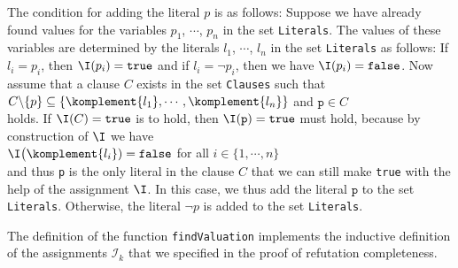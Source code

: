 \begin{enumerate}
      The condition for adding the literal $p$ is as follows:
      Suppose we have already found values for the variables
      $p_1$, $\cdots$, $p_n$ in the set \texttt{Literals}.
      The values of these variables are determined by the literals $l_1$, $\cdots$, $l_n$ in the set \texttt{Literals}
      as follows: If $l_i = p_i$, then $\I(p_i) = \texttt{true}$
      and if $l_i = \neg p_i$, then we have $\I(p_i) = \texttt{false}$.
      Now assume that a clause $C$ exists in the set \texttt{Clauses} such that
      \\[0.2cm]
      \hspace*{1.3cm}
      $C \backslash \{p\} \subseteq \{ \komplement{l_1}, \cdots, \komplement{l_n} \}$ \quad and \quad $\texttt{p} \in C$
      \\[0.2cm]
      holds. If $\I(C) = \texttt{true}$ is to hold, then $\I(\texttt{p}) = \texttt{true}$ must hold, because
      by construction of $\I$ we have
      \\[0.2cm]
      \hspace*{1.3cm}
      $\I\bigl(\komplement{l_i}) = \texttt{false}$ \quad for all $i \in \{1,\cdots,n\}$
      \\[0.2cm]
      and thus \texttt{p} is the only literal in the clause $C$ that we can still make \texttt{true} with the help of the assignment $\I$. In this case, we thus add the literal
      $\texttt{p}$ to the set \texttt{Literals}. Otherwise, the literal $\neg p$ is added to the set
      \texttt{Literals}.
\end{enumerate}
The definition of the function \texttt{findValuation} implements the inductive definition of the assignments
$\mathcal{I}_k$ that we specified in the proof of refutation completeness.



